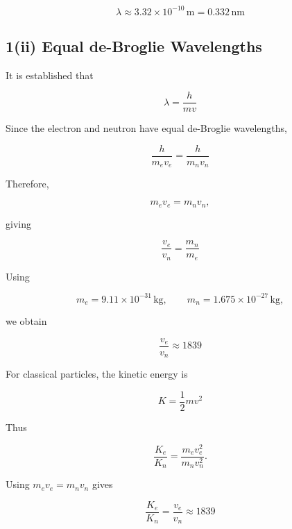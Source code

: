 \documentclass{article}
\begin{document}
\begin{equation*}
\boxed{\lambda\approx3.32\times10^{-10}\,\mathrm{m} = 0.332\,\mathrm{nm}}
\end{equation*}


\subsection*{1(ii) Equal de-Broglie Wavelengths}

It is established that

\begin{equation*}
\lambda=\frac{h}{mv}
\end{equation*}

Since the electron and neutron have equal de-Broglie wavelengths,

\begin{equation*}
\frac{h}{m_ev_e} = \frac{h}{m_nv_n}
\end{equation*}

Therefore,

\begin{equation*}
m_ev_e=m_nv_n,
\end{equation*}

giving

\begin{equation*}
\frac{v_e}{v_n} = \frac{m_n}{m_e}
\end{equation*}

Using

\begin{equation*}
m_e = 9.11 \times 10^{-31} \,\mathrm{kg},
\qquad
m_n = 1.675 \times 10^{-27} \,\mathrm{kg},
\end{equation*}

we obtain

\begin{equation*}
\boxed{\frac{v_e}{v_n} \approx 1839}
\end{equation*}

For classical particles, the kinetic energy is

\begin{equation*}
K=\frac{1}{2}mv^2
\end{equation*}

Thus

\begin{equation*}
\frac{K_e}{K_n} = \frac{m_ev_e^2}{m_nv_n^2}.
\end{equation*}

Using $m_e v_e = m_n v_n$ gives

\begin{equation*}
\boxed{\frac{K_e}{K_n} = \frac{v_e}{v_n} \approx 1839}
\end{equation*}
\end{document}
